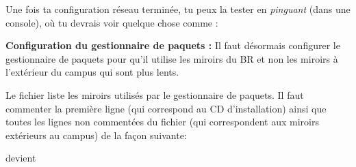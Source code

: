 % 
% 
% 
% 


Une fois ta configuration r\'eseau termin\'ee, tu peux la tester en \emph{pinguant} \fkz (dans une console), o\`u tu devrais voir quelque chose comme :


\label{ubuntu_mirror} {\bf Configuration du gestionnaire de paquets
:} Il faut d\'esormais configurer le gestionnaire de paquets pour
qu'il utilise les miroirs du BR et non les miroirs \`a l'ext\'erieur du
campus qui sont plus lents.

Le fichier  liste les miroirs utilis\'es par le gestionnaire de paquets. Il faut commenter la premi\`ere ligne (qui
correspond au CD d'installation) ainsi que toutes les lignes non comment\'ees du fichier (qui correspondent aux miroirs ext\'erieurs au campus) de la
fa\c{c}on suivante:


devient

